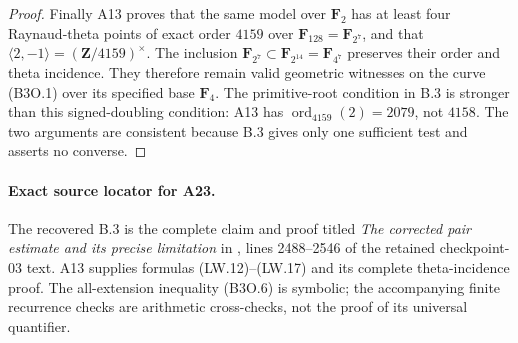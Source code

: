 \begin{proof}
Finally A13 proves that the same model over $\mathbf F_2$
has at least four Raynaud-theta points of exact order
$4159$ over $\mathbf F_{128}=\mathbf F_{2^7}$, and that
$\langle2,-1\rangle=(\mathbf Z/4159)^\times$.
The inclusion
$\mathbf F_{2^7}\subset\mathbf F_{2^{14}}=\mathbf F_{4^7}$
preserves their order and theta incidence.  They therefore
remain valid geometric witnesses on the curve (B3O.1)
over its specified base $\mathbf F_4$.
The primitive-root condition in B.3 is stronger than this
signed-doubling condition: A13 has
$\operatorname{ord}_{4159}(2)=2079$, not $4158$.
The two arguments are consistent because B.3 gives only
one sufficient test and asserts no converse.
\end{proof}

\paragraph{Exact source locator for A23.}
The recovered B.3 is the complete claim and proof titled
\emph{The corrected pair estimate and its precise limitation}
in , lines 2488--2546 of the
retained checkpoint-03 text.  A13 supplies formulas
(LW.12)--(LW.17) and its complete theta-incidence proof.
The all-extension inequality (B3O.6) is symbolic; the
accompanying finite recurrence checks are arithmetic
cross-checks, not the proof of its universal quantifier.
